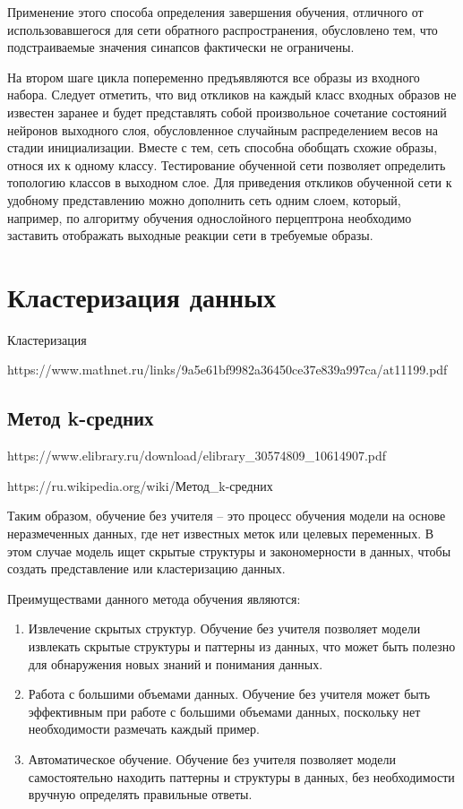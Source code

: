\documentclass[bachelor, och, referat]{SCWorks}
\begin{document}
Применение этого способа определения завершения обучения, отличного от
использовавшегося для сети обратного распространения, обусловлено тем, что подстраиваемые
значения синапсов фактически не ограничены. 

На втором шаге цикла попеременно предъявляются все образы из входного набора.
Следует отметить, что вид откликов на каждый класс входных образов не известен
заранее и будет представлять собой произвольное сочетание состояний нейронов выходного
слоя, обусловленное случайным распределением весов на стадии инициализации. Вместе с тем,
сеть способна обобщать схожие образы, относя их к одному классу. Тестирование обученной
сети позволяет определить топологию классов в выходном слое. Для приведения откликов
обученной сети к удобному представлению можно дополнить сеть одним слоем, который,
например, по алгоритму обучения однослойного перцептрона необходимо заставить отображать
выходные реакции сети в требуемые образы.

\section{Кластеризация данных}
Кластеризация

https://www.mathnet.ru/links/9a5e61bf9982a36450ce37e839a997ca/at11199.pdf

\subsection{Метод k-средних}
https://www.elibrary.ru/download/elibrary_30574809_10614907.pdf

https://ru.wikipedia.org/wiki/Метод_k-средних

\conclusion
Таким образом, обучение без учителя -- это процесс обучения модели на основе неразмеченных данных, где нет известных меток или целевых переменных. В этом случае модель ищет скрытые структуры и закономерности в данных, чтобы создать представление или кластеризацию данных.

Преимуществами данного метода обучения являются:
\begin{enumerate}
    \item Извлечение скрытых структур. Обучение без учителя позволяет модели извлекать скрытые структуры и паттерны из данных, что может быть полезно для обнаружения новых знаний и понимания данных.
    \item Работа с большими объемами данных. Обучение без учителя может быть эффективным при работе с большими объемами данных, поскольку нет необходимости размечать каждый пример.
    \item Автоматическое обучение. Обучение без учителя позволяет модели самостоятельно находить паттерны и структуры в данных, без необходимости вручную определять правильные ответы.
\end{enumerate}
\end{document}
